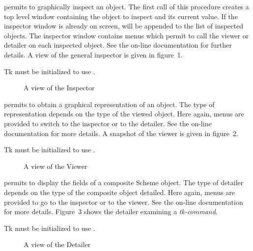 \begin{entry}{%
}
\saut %
 permits to graphically inspect an object. The first call
of this procedure creates a top level window containing the object to
inspect and its current value. If the inspector window is already on
screen,  will be appended to the list of inspected objects.
The inspector window contains menus which permit to call the viewer or
detailer on each inspected object. See the on-line documentation for
further details. A view of the general inspector is given in figure~1.

\begin{note}
Tk must be initialized to use .
\end{note}

\begin{figure}
\centerline{}
\caption{A view of the Inspector}
\end{figure}
\end{entry}


\begin{entry}{%
}
\saut %
 permits to obtain a graphical representation of an {\stk}
object. The type of representation depends on the type of the viewed
object. Here again, menus are provided to switch to the inspector or
to the detailer. See the on-line documentation for more details. A
snapshot of the viewer is given in figure~2.

\begin{note}
Tk must be initialized to use .
\end{note}

\begin{figure}
\centerline{}
\caption{A view of the Viewer}
\end{figure}

\end{entry}


\begin{entry}{%
}
\saut %
 permits to display the fields of a composite Scheme
object.  The type of detailer depends on the type of the composite
object detailed. Here again, menus are provided to go to the inspector
or to the viewer. See the on-line documentation for more details.
Figure~3 shows the detailer examining a {\em tk-command}.

\begin{note}
Tk must be initialized to use .
\end{note}

\begin{figure}
\centerline{}
\caption{A view of the Detailer}
\end{figure}
\end{entry}

